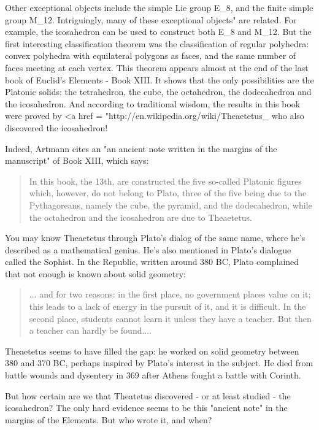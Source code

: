 Other exceptional objects include the simple Lie group E_{8},
and the finite simple group M_{12}.  Intriguingly, many of
these exceptional objects" are related.  For example, the
icosahedron can be used to construct both E_{8} and
M_{12}.  But the first interesting classification theorem was
the classification of regular polyhedra: convex polyhedra with
equilateral polygons as faces, and the same number of faces meeting at
each vertex.  This theorem appears almost at the end of the last book
of Euclid's Elements - Book XIII.  It shows that the only
possibilities are the Platonic solids: the tetrahedron, the cube, the
octahedron, the dodecahedron and the icosahedron. And according to
traditional wisdom, the results in this book were proved by <a href = "http://en.wikipedia.org/wiki/Theaetetus_%
who also discovered the icosahedron!

Indeed, Artmann cites an "an ancient note written in the margins of
the manuscript" of Book XIII, which says:

\begin{quote}
  In this book, the 13th, are constructed the five so-called Platonic 
  figures which, however, do not belong to Plato, three of the five 
  being due to the Pythagoreans, namely the cube, the pyramid, and 
  the dodecahedron, while the octahedron and the icosahedron are due 
  to Theaetetus. 
\end{quote}
    

You may know Theaetetus through Plato's dialog of the same name, where 
he's described as a mathematical genius.  He's also mentioned in 
Plato's dialogue called the Sophist.  In the Republic, written around 
380 BC, Plato complained that not enough is known about solid geometry:

\begin{quote}
  ... and for two reasons: in the first place, no government places 
  value on it; this leads to a lack of energy in the pursuit of it, 
  and it is difficult.  In the second place, students cannot learn it 
  unless they have a teacher.  But then a teacher can hardly be 
  found....
\end{quote}
    

Theaetetus seems to have filled the gap: he worked on solid geometry
between 380 and 370 BC, perhaps inspired by Plato's interest in the 
subject.  He died from battle wounds and dysentery in 369 after Athens
fought a battle with Corinth.

But how certain are we that Theatetus discovered - or at least studied -
the icosahedron?   The only hard evidence seems to be this "ancient 
note" in the margins of the Elements.  But who wrote it, and when?

